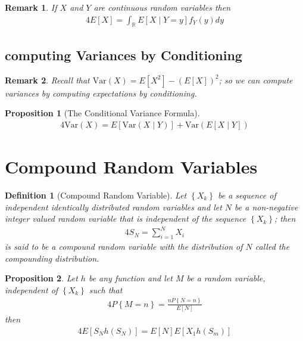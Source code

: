 \documentclass[11pt, oneside]{book}   	%
\newtheorem{definition}{Definition}[chapter]
\newtheorem{remark}{Remark}[chapter]
\newtheorem{proposition}{Proposition}[chapter]
\newcommand{\paren}[1]{\left(#1\right)}
\newcommand{\set}[1]{\left\{#1\right\}}
\newcommand{\var}[1]{\mathrm{Var}\left(#1\right)}
\begin{document}
\begin{remark}
	If $X$ and $Y$ are continuous random variables then 
	\begin{alignat}{4}
		E[X]=\int_\mathbb{R} E[X\mid Y=y]f_Y(y)dy
	\end{alignat}
\end{remark}

\subsection{computing Variances by Conditioning}

\begin{remark}
	Recall that $\var{X} = E\left[X^2\right] - \paren{E[X]}^2$; so we can compute variances by computing expectations by conditioning. 
\end{remark}

\begin{proposition}[The Conditional Variance Formula]
	\begin{alignat}{4}
		\var{X} = E\left[\var{X\mid Y}\right] + \var{E[X\mid Y]}
	\end{alignat}
\end{proposition}

\section{Compound Random Variables}

\begin{definition}[Compound Random Variable]
	Let $\set{X_k}$ be a sequence of independent identically distributed random variables and let $N$ be a non-negative integer valued random variable that is independent of the sequence $\set{X_k}$; then
	\begin{alignat}{4}
		S_N=\sum_{i=1}^N X_i
	\end{alignat}
	is said to be a \emph{compound random variable} with the distribution of $N$ called the \emph{compounding distribution}. 
	
\end{definition}

\begin{proposition}
	Let $h$ be any function and let $M$ be a random variable, independent of $\set{X_k}$ such that 
	\begin{alignat}{4}
		P\set{M=n}=\frac{nP\set{N=n}}{E[N]}
	\end{alignat} 
	then 
	\begin{alignat}{4}
		E[S_Nh(S_N)] = E[N]E[X_1h(S_m)]
	\end{alignat}
\end{proposition}
\end{document}
